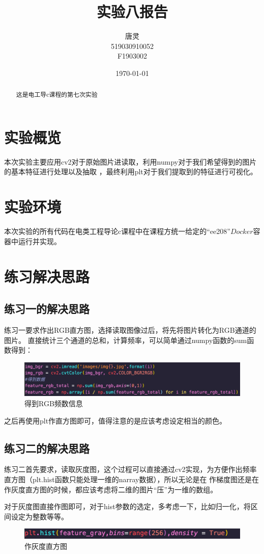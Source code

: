 \documentclass[UTF8]{ctexart}
\title{实验八报告}
\author{唐灵\\519030910052\\F1903002}
\date{\today}
\begin{document}
    \maketitle
    \begin{abstract}
        这是电工导c课程的第七次实验
    \end{abstract}
    \section{实验概览}
        本次实验主要应用cv2对于原始图片进读取，利用numpy对于我们希望得到的图片的基本特征进行处理以及抽取
        ，最终利用plt对于我们提取到的特征进行可视化。
    \section{实验环境}
    本次实验的所有代码在电类工程导论c课程中在课程方统一给定的“ee208”$Docker$容器中运行并实现。
    \section{练习解决思路}
        \subsection{练习一的解决思路}
            练习一要求作出RGB直方图，选择读取图像过后，将先将图片转化为RGB通道的图片。
            直接统计三个通道的总和，计算频率，可以简单通过numpy函数的sum函数得到：
            \begin{figure}[H]
                \centering
                \includegraphics[scale=0.4]{img/RGB.png}
                \caption{得到RGB频数信息}
            \end{figure}

            之后再使用plt作直方图即可，值得注意的是应该考虑设定相当的颜色。
        \subsection{练习二的解决思路}
            练习二首先要求，读取灰度图，这个过程可以直接通过cv2实现，为方便作出频率直方图（plt.hist函数只能处理一维的narray数据），所以无论是在
            作梯度图还是在作灰度直方图的时候，都应该考虑将二维的图片“压”为一维的数组。\par
            对于灰度图直接作图即可，对于hist参数的选定，多考虑一下，比如归一化，将区间设定为整数等等。
            \begin{figure}[H]
                \centering
                \includegraphics[scale=0.6]{img/gray.png}
                \caption{作灰度直方图}
            \end{figure}
\end{document}
